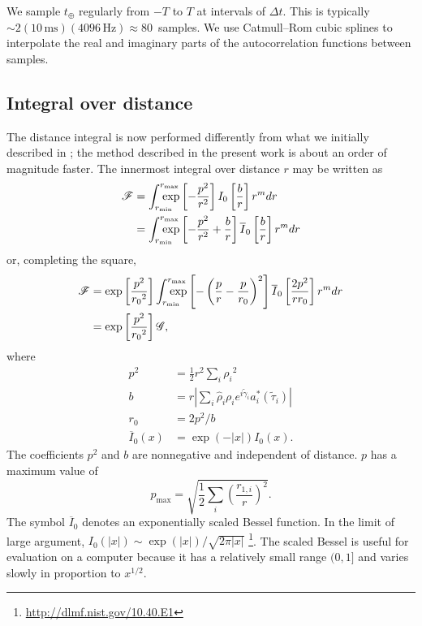 \documentclass[amsmath,amssymb,aps,prx,reprint,nopreprintnumbers,nofootinbib]{revtex4-1}
\def\mathrlap{\mathpalette\mathrlapinternal}
\def\mathrlapinternal#1#2{\rlap{$\mathsurround=0pt#1{#2}$}}
\begin{document}
We sample $t_\oplus$ regularly from $-T$ to $T$ at intervals of $\Delta t$. This is typically $\sim 2 (10\,\mathrm{ms})(4096\,\mathrm{Hz}) \approx 80$~samples. We use Catmull\nobreakdashes--Rom cubic splines to interpolate the real and imaginary parts of the autocorrelation functions between samples.

\subsection{Integral over distance}
\label{sec:distance}

The distance integral is now performed differently from what we initially described in \cite{leo-singer-thesis,BerryLocalization}; the method described in the present work is about an order of magnitude faster. The innermost integral over distance $r$ may be written as
%
\begin{align}\label{eq:distance-integral}
    \mathscr{F} &=
        \int_{\mathrlap{r_\mathrm{min}}}^{\mathrlap{r_\mathrm{max}}}
        \exp\left[-\frac{p^2}{r^2}\right]
        I_0\left[\frac{b}{r}\right] r^m dr \nonumber \\
    &=
        \int_{\mathrlap{r_\mathrm{min}}}^{\mathrlap{r_\mathrm{max}}}
        \exp\left[-\frac{p^2}{r^2}+\frac{b}{r}\right]
        \overline{I}_0\left[\frac{b}{r}\right] r^m dr
\end{align}
%
or, completing the square,
%
\begin{align}
    \mathscr{F} &= \exp\left[\frac{p^2}{{r_0}^2}\right]
        \int_{\mathrlap{r_\mathrm{min}}}^{\mathrlap{r_\mathrm{max}}}
        \exp\left[-\left(\frac{p}{r} - \frac{p}{r_0}\right)^2\right]
        \overline{I}_0\left[\frac{2p^2}{r r_0}\right] r^m dr \\
    &= \exp\left[\frac{p^2}{{r_0}^2}\right] \mathscr{G},
\end{align}
%
where
%
\begin{align}
    p^2 &= \frac{1}{2} r^2 \sum_i {\rho_i}^2 \label{eq:likelihood-p-factor} \\
    b &= r \left| \sum_i \hat\rho_i \rho_i e^{i \tilde{\gamma}_i}
        a_i^*(\tilde{\tau}_i) \right| \label{eq:likelihood-b-factor} \\
    r_0 &= 2 p^2 / b \\
    \overline{I}_0(x) &= \exp(-|x|) I_0(x).
\end{align}
%
The coefficients $p^2$ and $b$ are nonnegative and independent of distance. $p$ has a maximum value of
%
\begin{equation}
    p_\mathrm{max} = \sqrt{\frac{1}{2} \sum_i \left(\frac{r_{1,i}}{r}\right)^2}.
\end{equation}
%
The symbol $\overline{I}_0$ denotes an exponentially scaled Bessel function. In the limit of large argument, $I_0(|x|) \sim \exp(|x|) / \sqrt{2 \pi |x|}$ \citep{Olver:2010:NHMF,NIST:DLMF}\footnote{\url{http://dlmf.nist.gov/10.40.E1}}. The scaled Bessel is useful for evaluation on a computer because it has a relatively small range $(0, 1]$ and varies slowly in proportion to $x^{1/2}$.
\end{document}
